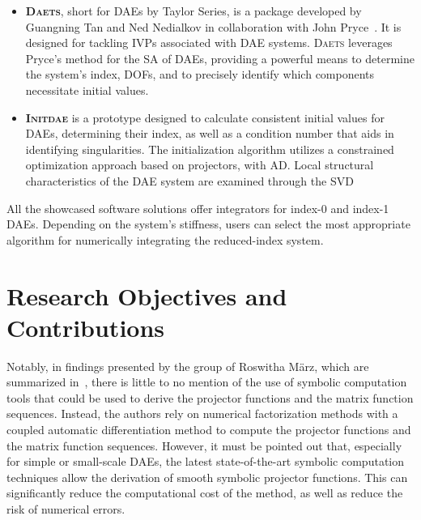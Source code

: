 \begin{itemize}
  \item \textbf{\textsc{Daets}}, short for \acp{DAE} by Taylor Series, is a \cpp{} package developed by Guangning Tan and Ned Nedialkov in collaboration with John Pryce~\cite{nedialkov2007solvingI, nedialkov2007solvingII, nedialkov2008solvingIII}. It is designed for tackling \acp{IVP} associated with \ac{DAE} systems. \textsc{Daets} leverages Pryce's method for the \ac{SA} of \acp{DAE}, providing a powerful means to determine the system's index, \acp{DOF}, and to precisely identify which components necessitate initial values.
  \item \textbf{\textsc{Initdae}} is a \Python{} prototype designed to calculate consistent initial values for \acp{DAE}, determining their index, as well as a condition number that aids in identifying singularities. The initialization algorithm utilizes a constrained optimization approach based on projectors, with \ac{AD}. Local structural characteristics of the \ac{DAE} system are examined through the \ac{SVD}~\cite{estvezschwarz2021initdae}
\end{itemize}
%
All the showcased software solutions offer integrators for index-0 and index-1 \acp{DAE}. Depending on the system's stiffness, users can select the most appropriate algorithm for numerically integrating the reduced-index system.


\section{Research Objectives and Contributions}

Notably, in findings presented by the group of Roswitha M{\"a}rz, which are summarized in~\cite{lamour2013differential}, there is little to no mention of the use of symbolic computation tools that could be used to derive the projector functions and the matrix function sequences. Instead, the authors rely on numerical factorization methods with a coupled automatic differentiation method to compute the projector functions and the matrix function sequences. However, it must be pointed out that, especially for simple or small-scale \acp{DAE}, the latest state-of-the-art symbolic computation techniques allow the derivation of smooth symbolic projector functions. This can significantly reduce the computational cost of the method, as well as reduce the risk of numerical errors.

